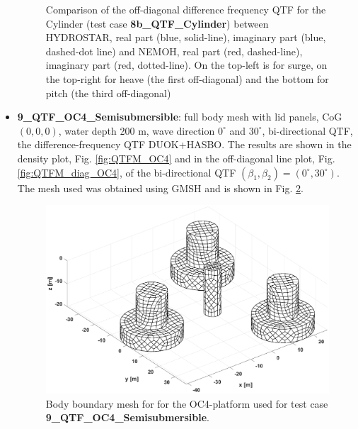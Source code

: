 \documentclass[12pt,a4paper,titlepage]{article}
\begin{document}
\begin{itemize}
\begin{figure}[h!tbp]
{}
	\caption{Comparison of the off-diagonal difference frequency QTF for the Cylinder (test case \textbf{8b\_QTF\_Cylinder}) between HYDROSTAR, real part (blue, solid-line), imaginary part (blue, dashed-dot line) and NEMOH, real part (red, dashed-line), imaginary part (red, dotted-line). On the top-left is for surge, on the top-right for heave (the first off-diagonal) and the bottom for pitch (the third off-diagonal)}\label{fig:QTFM_diag_Cylinder}
\end{figure}

\item \textbf{9\_QTF\_OC4\_Semisubmersible}: full body mesh with lid panels, CoG $(0,0,0)$, water depth 200 m, wave direction $0^{\circ}$ and $30^{\circ}$, bi-directional QTF, the difference-frequency QTF DUOK+HASBO. The results are shown in the density plot, Fig. \ref{fig:QTFM_OC4} and in the off-diagonal line plot, Fig. \ref{fig:QTFM_diag_OC4}, of the bi-directional QTF $(\beta_1,\beta_2)=(0^{\circ},30^{\circ})$. The mesh used was obtained using GMSH \cite{gmsh} and is shown in Fig. \ref{fig:meshesOC4}.

\begin{figure}[h!tbp]
\centering
\includegraphics[scale=0.5,trim = 50mm 15mm 50mm 18mm, clip]{figures/OC4/bodymesh.eps}
\caption{Body boundary mesh for for the OC4-platform used for test case \textbf{9\_QTF\_OC4\_Semisubmersible}.}\label{fig:meshesOC4}
\end{figure}




\end{itemize}
\end{document}
